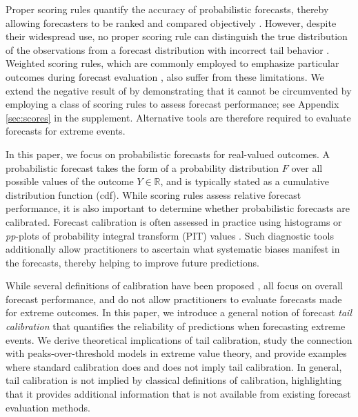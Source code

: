 \documentclass[12pt]{article}
\newcommand{\R}{\mathbb{R}}
\newcommand{\1}{\mathbf{1}} %
\theoremstyle{definition}
\begin{document}
Proper scoring rules quantify the accuracy of probabilistic forecasts, thereby allowing forecasters to be ranked and compared objectively \citep[see e.g.][]{GneitingRaftery2007}. However, despite their widespread use, no proper scoring rule can distinguish the true distribution of the observations from a forecast distribution with incorrect tail behavior \citep{BrehmerStrokorb2019}. Weighted scoring rules, which are commonly employed to emphasize particular outcomes during forecast evaluation \citep{DiksEtAl2011,GneitingRanjan2011,HolzmannKlar2017,LerchEtAl2017,AllenEtAl2023b,olafsdottir.2024.wscrps}, also suffer from these limitations. We extend the negative result of \citet{BrehmerStrokorb2019} by demonstrating that it cannot be circumvented by employing a class of scoring rules to assess forecast performance; see Appendix \ref{sec:scores} in the supplement. Alternative tools are therefore required to evaluate forecasts for extreme events. 

In this paper, we focus on probabilistic forecasts for real-valued outcomes. A probabilistic forecast takes the form of a probability distribution $F$ over all possible values of the outcome $Y \in \R$, and is typically stated as a cumulative distribution function (cdf). While scoring rules assess relative forecast performance, it is also important to determine whether probabilistic forecasts are calibrated.  Forecast calibration is often assessed in practice using histograms or \emph{pp}-plots of probability integral transform (PIT) values \citep{DieboldEtAl1998,GneitingEtAl2007}. Such diagnostic tools additionally allow practitioners to ascertain what systematic biases manifest in the forecasts, thereby helping to improve future predictions.

While several definitions of calibration have been proposed \cite[see][for a recent review]{GneitingResin2022}, all focus on overall forecast performance, and do not allow practitioners to evaluate forecasts made for extreme outcomes. In this paper, we introduce a general notion of forecast \emph{tail calibration} that quantifies the reliability of predictions when forecasting extreme events. We derive theoretical implications of tail calibration, study the connection with peaks-over-threshold models in extreme value theory, and provide examples where standard calibration does and does not imply tail calibration. In general, tail calibration is not implied by classical definitions of calibration, highlighting that it provides additional information that is not available from existing forecast evaluation methods.
\end{document}
